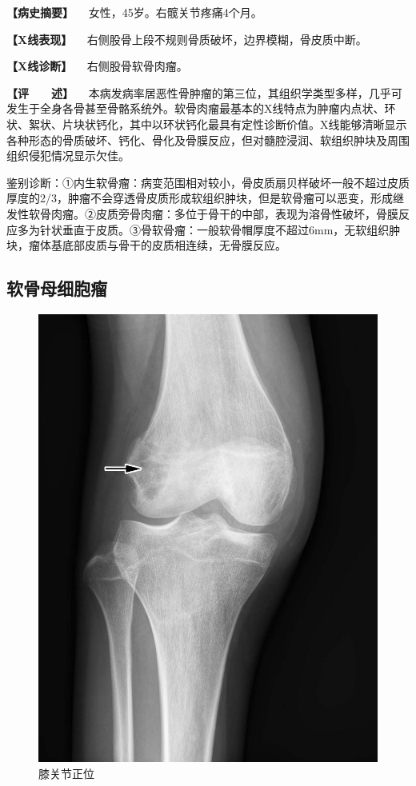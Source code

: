 \textbf{【病史摘要】} 　女性，45岁。右髋关节疼痛4个月。

\textbf{【X线表现】}
　右侧股骨上段不规则骨质破坏，边界模糊，骨皮质中断。

\textbf{【X线诊断】} 　右侧股骨软骨肉瘤。

\textbf{【评　　述】}
　本病发病率居恶性骨肿瘤的第三位，其组织学类型多样，几乎可发生于全身各骨甚至骨骼系统外。软骨肉瘤最基本的X线特点为肿瘤内点状、环状、絮状、片块状钙化，其中以环状钙化最具有定性诊断价值。X线能够清晰显示各种形态的骨质破坏、钙化、骨化及骨膜反应，但对髓腔浸润、软组织肿块及周围组织侵犯情况显示欠佳。

鉴别诊断：①内生软骨瘤：病变范围相对较小，骨皮质扇贝样破坏一般不超过皮质厚度的2/3，肿瘤不会穿透骨皮质形成软组织肿块，但是软骨瘤可以恶变，形成继发性软骨肉瘤。②皮质旁骨肉瘤：多位于骨干的中部，表现为溶骨性破坏，骨膜反应多为针状垂直于皮质。③骨软骨瘤：一般软骨帽厚度不超过6mm，无软组织肿块，瘤体基底部皮质与骨干的皮质相连续，无骨膜反应。

\subsection{软骨母细胞瘤}

\begin{figure}[!htbp]
 \centering
 \includegraphics{./images/Image00093.jpg}
 \captionsetup{justification=centering}
 \caption{膝关节正位}
 \label{fig2-7-8}
  \end{figure} 

